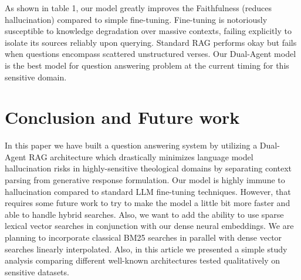 \documentclass[conference]{IEEEtran}
\begin{document}
As shown in table 1, our model greatly improves the Faithfulness (reduces hallucination) compared to simple fine-tuning. Fine-tuning is notoriously susceptible to knowledge degradation over massive contexts, failing explicitly to isolate its sources reliably upon querying. Standard RAG performs okay but fails when questions encompass scattered unstructured verses. Our Dual-Agent model is the best model for question answering problem at the current timing for this sensitive domain.

\section{Conclusion and Future work}
In this paper we have built a question answering system by utilizing a Dual-Agent RAG architecture which drastically minimizes language model hallucination risks in highly-sensitive theological domains by separating context parsing from generative response formulation. Our model is highly immune to hallucination compared to standard LLM fine-tuning techniques. However, that requires some future work to try to make the model a little bit more faster and able to handle hybrid searches. Also, we want to add the ability to use sparse lexical vector searches in conjunction with our dense neural embeddings. We are planning to incorporate classical BM25 searches in parallel with dense vector searches linearly interpolated. Also, in this article we presented a simple study analysis comparing different well-known architectures tested qualitatively on sensitive datasets.

\nocite{}



\end{document}
